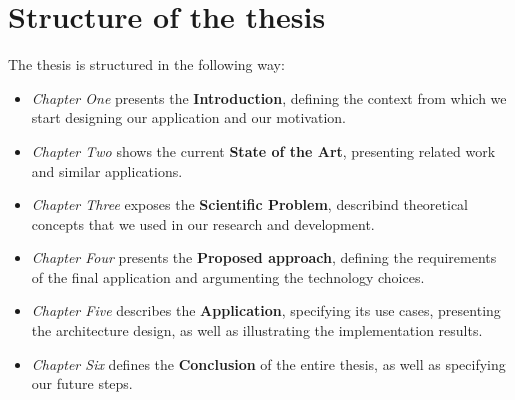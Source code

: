 \section{Structure of the thesis}
\label{section:structureOfTheThesis}

The thesis is structured in the following way:

\begin{itemize}
    \item \textit{Chapter One} presents the \textbf{Introduction}, defining the context from which we start designing our application and our motivation.
    \item \textit{Chapter Two} shows the current \textbf{State of the Art}, presenting related work and similar applications.
    \item \textit{Chapter Three} exposes the \textbf{Scientific Problem}, describind theoretical concepts that we used in our research and development.
    \item \textit{Chapter Four} presents the \textbf{Proposed approach}, defining the requirements of the final application and argumenting the technology choices.
    \item \textit{Chapter Five} describes the \textbf{Application}, specifying its use cases, presenting the architecture design, as well as illustrating the implementation results.
    \item \textit{Chapter Six} defines the \textbf{Conclusion} of the entire thesis, as well as specifying our future steps.
\end{itemize}

